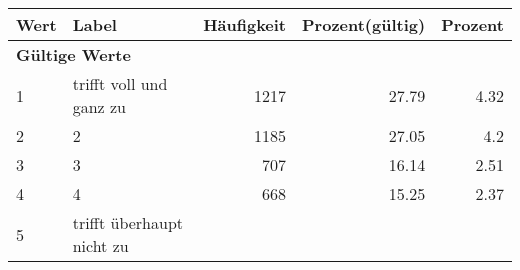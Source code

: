      \begin{longtable}{lXrrr}
     \toprule
     \textbf{Wert} & \textbf{Label} & \textbf{Häufigkeit} & \textbf{Prozent(gültig)} & \textbf{Prozent} \\
     \endhead
     \midrule
     \multicolumn{5}{l}{\textbf{Gültige Werte}}\\

     1 &
     \multicolumn{1}{X}{ trifft voll und ganz zu   } &


       \num{1217} &
       \num[round-mode=places,round-precision=2]{27.79} &
         \num[round-mode=places,round-precision=2]{4.32} \\

     2 &
     \multicolumn{1}{X}{ 2   } &


       \num{1185} &
       \num[round-mode=places,round-precision=2]{27.05} &
         \num[round-mode=places,round-precision=2]{4.2} \\

     3 &
     \multicolumn{1}{X}{ 3   } &


       \num{707} &
       \num[round-mode=places,round-precision=2]{16.14} &
         \num[round-mode=places,round-precision=2]{2.51} \\

     4 &
     \multicolumn{1}{X}{ 4   } &


       \num{668} &
       \num[round-mode=places,round-precision=2]{15.25} &
         \num[round-mode=places,round-precision=2]{2.37} \\

     5 &
     \multicolumn{1}{X}{ trifft überhaupt nicht zu   } &



\end{longtable}

